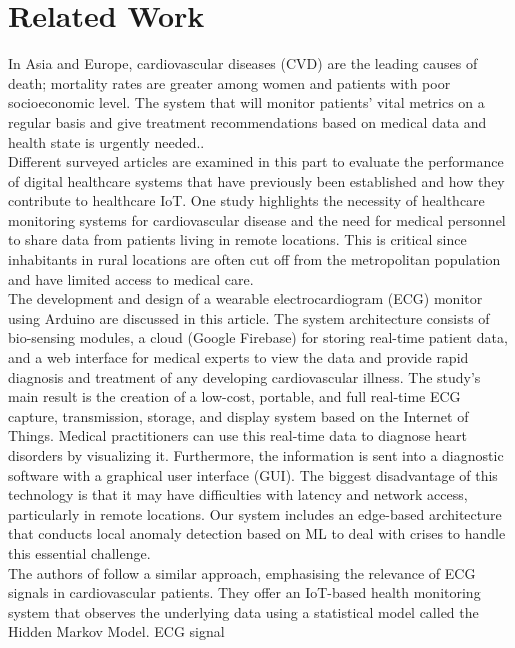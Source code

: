 \documentclass{bmcart}
\begin{document}
\section*{Related Work}
In Asia and Europe, cardiovascular diseases (CVD) are the leading causes of
death; mortality rates are greater among women and patients with poor
socioeconomic level. The system that will monitor patients' vital metrics on a
regular basis and give treatment recommendations based on medical data and
health state is urgently needed.\cite{app12010519}.\\
Different surveyed articles are examined in this part to evaluate the
performance of digital healthcare systems that have previously been established
and how they contribute to healthcare IoT. One study \cite{Varshney2019IoTBE}
highlights the necessity of healthcare monitoring systems for cardiovascular
disease and the need for medical personnel to share data from patients living in
remote locations. This is critical since inhabitants in rural locations are
often cut off from the metropolitan population and have limited access to
medical care.\\
The development and design of a wearable electrocardiogram (ECG) monitor using
Arduino are discussed in this article. The system architecture consists of
bio-sensing modules, a cloud (Google Firebase) for storing real-time patient
data, and a web interface for medical experts to view the data and provide rapid
diagnosis and treatment of any developing cardiovascular illness. The study's
main result is the creation of a low-cost, portable, and full real-time ECG
capture, transmission, storage, and display system based on the Internet of
Things. Medical practitioners can use this real-time data to diagnose heart
disorders by   visualizing it. Furthermore, the information is sent into a
diagnostic software with a graphical user interface (GUI). The biggest
disadvantage of this technology is that it may have difficulties with latency
and network access, particularly in remote locations. Our system includes an
edge-based architecture that conducts local anomaly detection based on ML to
deal with crises to handle this essential challenge.\\
The authors of \cite{0a1fa6938fc34df1a7b0b24631b3a22c} follow a similar
approach, emphasising the relevance of ECG signals in cardiovascular patients.
They offer an IoT-based health monitoring system that observes the underlying
data using a statistical model called the Hidden Markov Model. ECG signal
\end{document}
